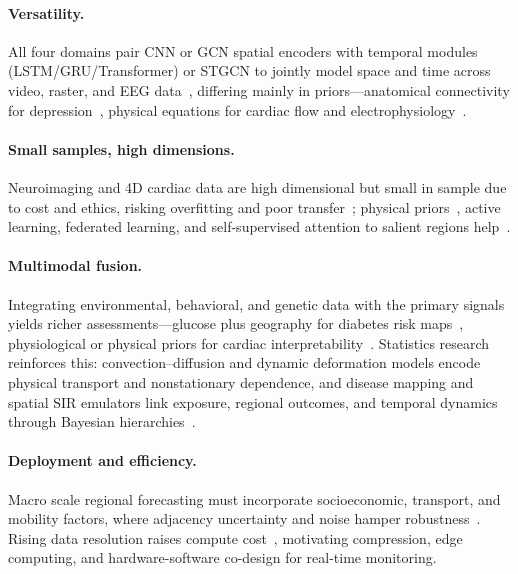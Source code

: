 \documentclass[journal]{IEEEtran}
\begin{document}
\fi

\paragraph{Versatility.} All four domains pair CNN or GCN spatial encoders with temporal modules (LSTM/GRU/Transformer) or STGCN to jointly model space and time across video, raster, and EEG data~\cite{2,3,4,6}, differing mainly in priors---anatomical connectivity for depression~\cite{4}, physical equations for cardiac flow and electrophysiology~\cite{5,7}.

\paragraph{Small samples, high dimensions.} Neuroimaging and 4D cardiac data are high dimensional but small in sample due to cost and ethics, risking overfitting and poor transfer~\cite{4,5,6}; physical priors~\cite{7}, active learning, federated learning, and self-supervised attention to salient regions help~\cite{2,4}.

\paragraph{Multimodal fusion.} Integrating environmental, behavioral, and genetic data with the primary signals yields richer assessments---glucose plus geography for diabetes risk maps~\cite{XiaoLi2016DiabetesSpatiotemporal}, physiological or physical priors for cardiac interpretability~\cite{5,7}. Statistics research reinforces this: convection--diffusion and dynamic deformation models encode physical transport and nonstationary dependence, and disease mapping and spatial SIR emulators link exposure, regional outcomes, and temporal dynamics through Bayesian hierarchies~\cite{liu2022convectionDiffusion,castroMorales2025dynamicDeformation,wang2024respiratoryDiseaseMapping,trostle2024spatialSIR,wikle2023statisticalDeepLearning}.

\paragraph{Deployment and efficiency.} Macro scale regional forecasting must incorporate socioeconomic, transport, and mobility factors, where adjacency uncertainty and noise hamper robustness~\cite{2,3}. Rising data resolution raises compute cost~\cite{5,7}, motivating compression, edge computing, and hardware-software co-design for real-time monitoring.
\end{document}
